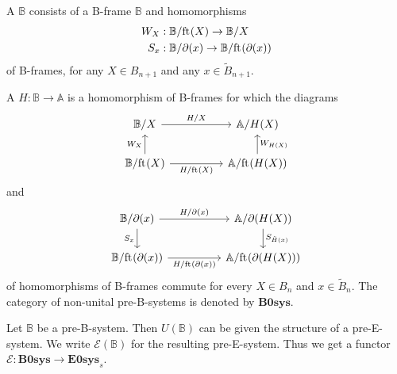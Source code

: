\begin{defn}
A  $\mathbb{B}$ consists of a B-frame $\mathbb{B}$ and homomorphisms
\begin{align*}
W_{X} & : \mathbb{B}/\mathrm{ft}_{}(X)\to\mathbb{B}/X\\
S_{x} & : \mathbb{B}/\partial_{}(x)\to\mathbb{B}/\mathrm{ft}_{}(\partial_{}(x))
\end{align*}
of B-frames, for any $X\in B_{n+1}$ and any $x\in\tilde{B}_{n+1}$. 

A  $H:\mathbb{B}\to\mathbb{A}$ is a homomorphism of B-frames
for which the diagrams
\begin{equation*}
\begin{tikzcd}[column sep=huge]
\mathbb{B}/X \arrow[r,"H/X"] & \mathbb{A}/H(X) \\
\mathbb{B}/\eft(X) \arrow[u,"W_X"] \arrow[r,swap,"H/\eft(X)"] & \mathbb{A}/\eft(H(X)) \arrow[u,swap,"W_{H(X)}"]
\end{tikzcd}
\end{equation*}
and
\begin{equation*}
\begin{tikzcd}[column sep=huge]
\mathbb{B}/\ebd(x) \arrow[r,"H/\ebd(x)"] \arrow[d,swap,"S_x"] & \mathbb{A}/\ebd(H(X)) \arrow[d,"S_{\tilde{H}(x)}"] \\
\mathbb{B}/\eft(\ebd(x)) \arrow[r,swap,"H/\eft(\ebd(x))"] & \mathbb{A}/\eft(\ebd(H(X)))
\end{tikzcd}
\end{equation*}
of homomorphisms of B-frames commute for every 
$X\in B_n$ and $x\in\tilde{B}_n$. The category of non-unital pre-B-systems is denoted
by $\mathbf{B0sys}$.
\end{defn}

\begin{comment}
\begin{lem}
When $\mathbb{B}$ has the structure of a pre-B-system, then so does each $\mathbb{B}/X$.
\end{lem}

\begin{proof}
Straightforward.
\end{proof}
\end{comment}

\begin{defn}
Let $\mathbb{B}$ be a pre-B-system. Then $U(\mathbb{B})$ can be given the structure
of a pre-E-system. We write $\mathcal{E}(\mathbb{B})$ for the resulting
pre-E-system. Thus we get a functor $\mathcal{E}:\mathbf{B0sys}\to\mathbf{E0sys}_s$.
\end{defn}

